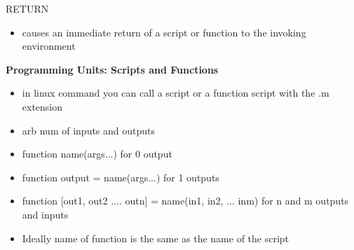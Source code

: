 RETURN
\begin{itemize}
    \item causes an immediate return of a script or function to the invoking environment
\end{itemize}



\textbf{Programming Units: Scripts and Functions}
\begin{itemize}
    \item in linux command you can call a script or a function script with the .m extension
    \item arb num of inputs and outputs
    \item function name(args...) for 0 output
    \item function output = name(args...) for 1 outputs
    \item function [out1, out2 .... outn] = name(in1, in2, ... inm) for n and m outputs and inputs
    \item Ideally name of function is the same as the name of the script
    
\end{itemize}

